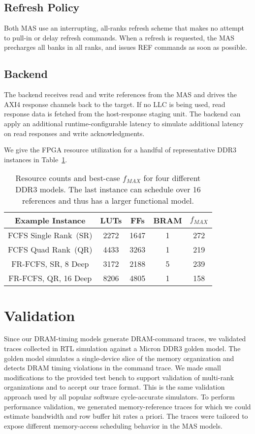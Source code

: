 \subsection{Refresh Policy}
Both MAS use an interrupting, all-ranks refresh scheme that makes no attempt to
pull-in or delay refresh commands.  When a refresh is requested, the MAS
precharges all banks in all ranks, and issues REF commands as soon as possible.

\subsection{Backend}
The backend receives read and write references from the MAS and drives the AXI4
response channels back to the target. If no LLC is being used, read response data is fetched from the host-response staging unit.
The backend can apply an additional runtime-configurable latency to simulate
additional latency on read responses and write acknowledgments.

We give the FPGA resource utilization for a handful of representative DDR3
instances in Table~\ref{tbl:dram-model-resources}.

\begin{table}[htb]
\centering
    \begin{tabular}{c c c c c}
	\hline
        \textbf{Example Instance} & LUTs & FFs & BRAM & $f_{MAX}$ \\
	\hline
        FCFS Single Rank~(SR)    & 2272 & 1647 & 1 & 272 \\
        FCFS Quad Rank~(QR)    & 4433 & 3263 & 1 & 219 \\
        FR-FCFS, SR, 8 Deep & 3172 & 2188 & 5 & 239 \\
        FR-FCFS, QR, 16 Deep & 8206 & 4805 & 1 & 158 \\
	\hline
	\end{tabular}
    \caption{Resource counts and best-case $f_{MAX}$ for four different DDR3
    models. The last instance can schedule over 16 references and thus has a larger functional model.}
\label{tbl:dram-model-resources}
\vspace{-0.35in}
\end{table}

\section{Validation}
Since our DRAM-timing models generate DRAM-command traces, we validated
traces collected in RTL simulation against a Micron DDR3 golden model. The golden
model simulates a single-device slice of the memory organization and detects
DRAM timing violations in the command trace.  We made small modifications to
the provided test bench to support validation of multi-rank organizations and
to accept our trace format. This is the same validation approach used by all
popular software cycle-accurate simulators.
To perform performance validation, we generated memory-reference traces for
which we could estimate bandwidth and row buffer hit rates a priori. The traces
were tailored to expose different memory-access scheduling behavior in the MAS
models.

